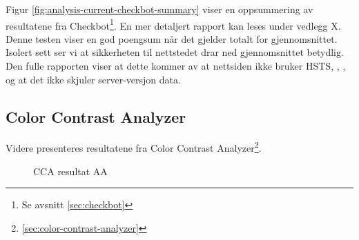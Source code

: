  Figur \ref{fig:analysis-current-checkbot-summary} viser en oppsummering av resultatene fra Checkbot\footnote{Se avsnitt \ref{sec:checkbot}}. En mer detaljert rapport kan leses under vedlegg X. Denne testen viser en god poengsum når det gjelder totalt for gjennomsnittet. Isolert sett ser vi at sikkerheten til nettstedet drar ned gjennomsnittet betydlig. Den fulle rapporten viser at dette kommer av at nettsiden ikke bruker HSTS, , ,  og at det ikke skjuler server-versjon data.

\subsection{Color Contrast Analyzer}
\label{sec:analysis-current-color-contrast-analyzer}
Videre presenteres resultatene fra Color Contrast Analyzer\footnote{\ref{sec:color-contrast-analyzer}}.

\begin{figure}[H]
    \centering
    \caption{CCA resultat AA}
    \label{fig:analysis-current-cca-aa}
\end{figure}

